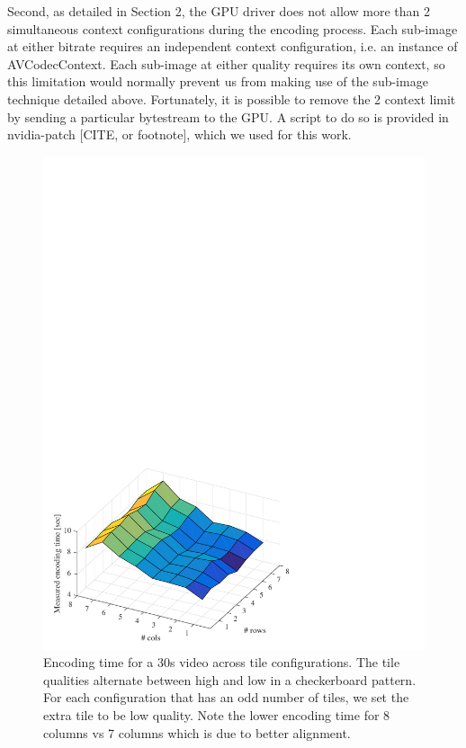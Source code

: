 Second, as detailed in Section 2, the GPU driver does not allow more than 2 simultaneous context configurations during the encoding process. Each sub-image at either bitrate requires an independent context configuration, i.e. an instance of AVCodecContext. Each sub-image at either quality requires its own context, so this limitation would normally prevent us from making use of the sub-image technique detailed above. Fortunately, it is possible to remove the 2 context limit by sending a particular bytestream to the GPU. A script to do so is provided in nvidia-patch [CITE, or footnote], which we used for this work.

\begin{figure}[t]
	\includegraphics[width=\columnwidth]{figures/times_v1.pdf}
	\caption{Encoding time for a 30s video across tile configurations. The tile qualities alternate between high and low in a checkerboard pattern. For each configuration that has an odd number of tiles, we set the extra tile to be low quality. Note the lower encoding time for 8 columns vs 7 columns which is due to better alignment.}
	\label{fig:time}
\end{figure}

